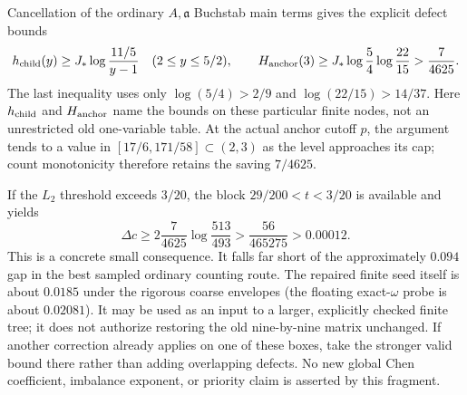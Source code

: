 Cancellation of the ordinary $A,\mathfrak a$ Buchstab main terms gives
the explicit defect bounds
\begin{equation}\label{eq:replacement-second-seed-h3}
 h_{\rm child}(y)\ge J_*\log\frac{11/5}{y-1}
 \quad(2\le y\le5/2),\qquad
 H_{\rm anchor}(3)\ge
 J_*\log\frac54\log\frac{22}{15}
 >\frac7{4625}.
\end{equation}
The last inequality uses only
$\log(5/4)>2/9$ and $\log(22/15)>14/37$.
Here $h_{\rm child}$ and $H_{\rm anchor}$ name the bounds on these
particular finite nodes, not an unrestricted old one-variable table.
At the actual anchor cutoff $p$, the argument tends to a value in
$[17/6,171/58]\subset(2,3)$ as the level approaches its cap;
count monotonicity therefore retains
the saving $7/4625$.

If the $L_2$ threshold exceeds $3/20$, the block
$29/200<t<3/20$ is available and yields
\begin{equation}\label{eq:replacement-second-seed-l2-gain}
 \Delta c\ge2\frac7{4625}\log\frac{513}{493}
 >\frac{56}{465275}>0.00012.
\end{equation}
This is a concrete small consequence.  It falls far short of the
approximately $0.094$ gap in the best sampled ordinary counting route.
The repaired finite seed itself is about $0.0185$ under the rigorous
coarse envelopes (the floating exact-$\omega$ probe is about $0.02081$).
It may be used as an input to a larger, explicitly checked finite tree;
it does not authorize restoring the old nine-by-nine matrix unchanged.
If another correction already applies on one of these boxes, take the
stronger valid bound there rather than adding overlapping defects.
No new global Chen coefficient, imbalance exponent, or priority claim
is asserted by this fragment.

